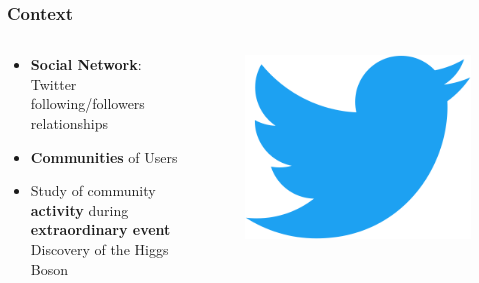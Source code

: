 \documentclass{beamer}
\begin{document}

\begin{frame}
\frametitle{Context}

\begin{columns}
	\begin{column}{0.6\textwidth}
	\begin{itemize}
		\item \textbf{Social Network}: Twitter \\following/followers relationships
		\vspace{0.6cm}
		\item \textbf{Communities} of Users
		\vspace{0.6cm}
		\item Study of community \textbf{activity} during \textbf{extraordinary event} \\ \vspace{0.3cm} \hspace{1cm} \textbf{\textrightarrow}   Discovery of the Higgs Boson 

	\end{itemize}
	\end{column}
	\begin{column}{0.4\textwidth}
		\begin{figure}
		\includegraphics[width=0.6\linewidth]{figures/twitter_logo}
		\end{figure}
	\end{column}
\end{columns}
\end{frame}

\end{document}

